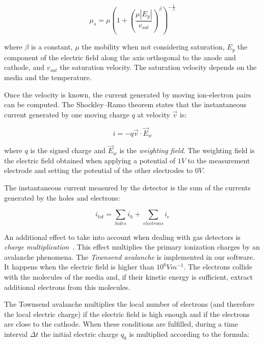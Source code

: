 \documentclass[11pt]{article}
\begin{document}
	\begin{equation}
		\mu_s = \mu \left (1 + \left (\frac{\mu |E_y|}{v_{sat}} \right )^{\beta} \right )^{-\frac{1}{\beta}}
		\label{eq:saturation}
	\end{equation}

	where $\beta$ is a constant, $\mu$ the mobility when not considering saturation,
	$E_y$ the component of the electric field along the axis orthogonal to the anode and cathode,
	and $v_{sat}$ the saturation velocity. The saturation velocity depends on the
	media and the temperature.

	Once the velocity is known, the current generated by moving ion-electron
	pairs can be computed. The Shockley–Ramo theorem states that the instantaneous current generated
	by one moving charge $q$ at velocity $\vec{v}$ is:

	\begin{equation}
		i = -q \vec{v} \cdot \vec{E}_w
		\label{eq:ramo}
	\end{equation}

	where $q$ is the signed charge and $\vec{E}_w$ is the \textit{weighting field}. The weighting field is the electric field
	obtained when applying a potential of $1V$ to the measurement electrode and setting
	the potential of the other electrodes to $0V$.

	The instantaneous current measured
	by the detector is the sum of the currents generated by the holes and electrons:

	\begin{equation}
		i_{tot} = \sum_{holes} i_h + \sum_{electrons} i_e
		\label{eq:tot_current}
	\end{equation}

	An additional effect to take into account  when dealing with gas detectors is
	\textit{charge multiplication}~\cite{lphy2236}. This effect
	multiplies the primary ionization charges by an avalanche phenomena.
	The \textit{Townsend avalanche} is implemented in our software. It happens
	when the electric field is higher than $10^6Vm^{-1}$. The electrons collide
	with the molecules of the media and, if their kinetic energy is sufficient,
	extract additional electrons from this molecules.

	The Townsend avalanche multiplies the local number of electrons (and therefore the local electric
	charge) if the electric field is high enough and if the electrons are close
	to the cathode. When these conditions are fulfilled, during a time interval
	$\Delta t$ the initial electric charge $q_0$ is multiplied
	according to the formula:
\end{document}
